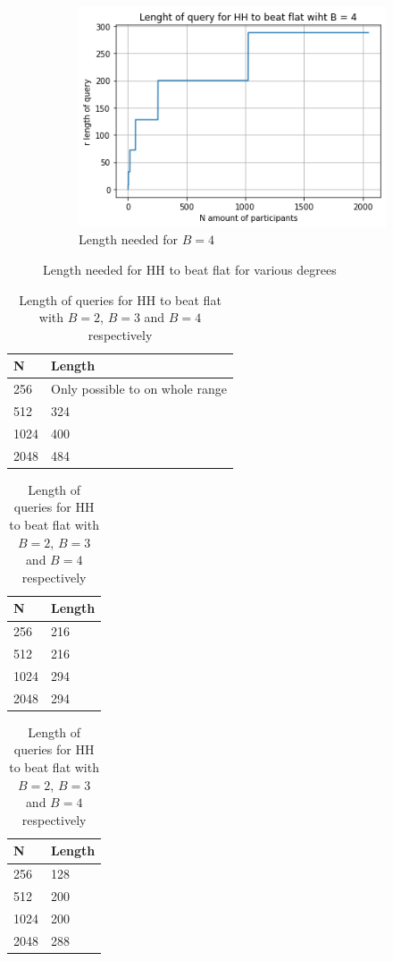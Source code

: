 \documentclass[11pt]{article}
\theoremstyle{definition}
\begin{document}
\begin{figure}[H]
\begin{subfigure}[b]{0.3\textwidth}
         \includegraphics[width=\textwidth]{figures/benefit_4.png}
         \caption{Length needed for $B=4$}
         \label{fig:five over x}
     \end{subfigure}
        \caption{Length needed for HH to beat flat for various degrees}
        \label{fig:benefit}
\end{figure}
\begin{table}[H]
\centering
\begin{tabular}{|l|l|}
\hline
N    &  Length     \\ \hline
256  & Only possible to on whole range \\ \hline
512  & 324        \\ \hline
1024 & 400         \\ \hline
2048 & 484         \\ \hline
\end{tabular}
\quad
\begin{tabular}{|l|l|}
\hline
N    &  Length     \\ \hline
256  & 216 \\ \hline
512  & 216        \\ \hline
1024 & 294         \\ \hline
2048 & 294         \\ \hline
\end{tabular}
\quad
\begin{tabular}{|l|l|}
\hline
N    &  Length     \\ \hline
256  & 128 \\ \hline
512  & 200        \\ \hline
1024 & 200         \\ \hline
2048 & 288         \\ \hline
\end{tabular}
\caption{Length of queries for HH to beat flat with $B=2$, $B=3$ and $B=4$ respectively}
\label{flat_v_hh}
\end{table}
\end{document}
